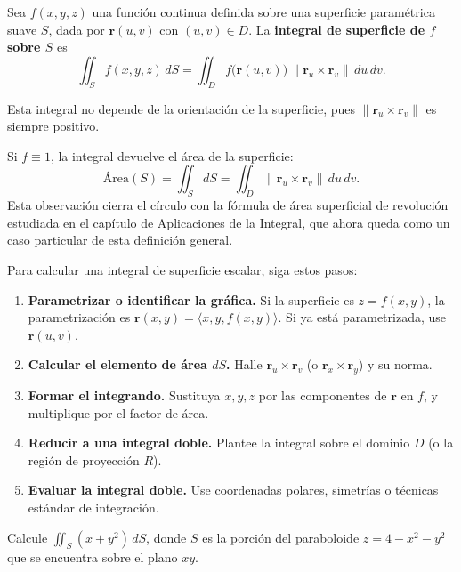 \begin{definition}
Sea $f(x,y,z)$ una función continua definida sobre una superficie paramétrica suave $S$, dada por $\mathbf{r}(u,v)$ con $(u,v)\in D$. La \textbf{integral de superficie de $f$ sobre $S$} es
\[
\iint_S f(x,y,z)\,dS
=
\iint_D f\bigl(\mathbf{r}(u,v)\bigr)\,\|\mathbf{r}_u \times \mathbf{r}_v\|\,du\,dv.
\]
\end{definition}

Esta integral no depende de la orientación de la superficie, pues $\| \mathbf{r}_u \times \mathbf{r}_v \|$ es siempre positivo.

\begin{rem}
Si $f\equiv 1$, la integral devuelve el área de la superficie:
\[
\text{Área}(S) = \iint_S dS = \iint_D \|\mathbf{r}_u \times \mathbf{r}_v\|\,du\,dv.
\]
Esta observación cierra el círculo con la fórmula de área superficial de revolución estudiada en el capítulo de Aplicaciones de la Integral, que ahora queda como un caso particular de esta definición general.
\end{rem}

\begin{pasos}
Para calcular una integral de superficie escalar, siga estos pasos:
\begin{enumerate}
\item \textbf{Parametrizar o identificar la gráfica.} Si la superficie es $z=f(x,y)$, la parametrización es $\mathbf{r}(x,y)=\langle x,y,f(x,y)\rangle$. Si ya está parametrizada, use $\mathbf{r}(u,v)$.
\item \textbf{Calcular el elemento de área $dS$.} Halle $\mathbf{r}_u \times \mathbf{r}_v$ (o $ \mathbf{r}_x \times \mathbf{r}_y$) y su norma.
\item \textbf{Formar el integrando.} Sustituya $x,y,z$ por las componentes de $\mathbf{r}$ en $f$, y multiplique por el factor de área.
\item \textbf{Reducir a una integral doble.} Plantee la integral sobre el dominio $D$ (o la región de proyección $R$).
\item \textbf{Evaluar la integral doble.} Use coordenadas polares, simetrías o técnicas estándar de integración.
\end{enumerate}
\end{pasos}

\begin{example}
Calcule $\displaystyle \iint_S (x+y^2)\,dS$, donde $S$ es la porción del paraboloide $z=4-x^2-y^2$ que se encuentra sobre el plano $xy$.
\end{example}

